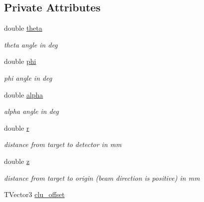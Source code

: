 \subsection*{Private Attributes}
\begin{DoxyCompactItemize}
\item 
\hypertarget{class_m_b_geometry_a1bdb9b371a2cd9839cf471e501ba3e73}{double \hyperlink{class_m_b_geometry_a1bdb9b371a2cd9839cf471e501ba3e73}{theta}}\label{class_m_b_geometry_a1bdb9b371a2cd9839cf471e501ba3e73}

\begin{DoxyCompactList}\small\item\em theta angle in deg \end{DoxyCompactList}\item 
\hypertarget{class_m_b_geometry_a464c0fbdaaaaf45ede649138121be18b}{double \hyperlink{class_m_b_geometry_a464c0fbdaaaaf45ede649138121be18b}{phi}}\label{class_m_b_geometry_a464c0fbdaaaaf45ede649138121be18b}

\begin{DoxyCompactList}\small\item\em phi angle in deg \end{DoxyCompactList}\item 
\hypertarget{class_m_b_geometry_ace0d3a561b209a84a82d5ea1c4498dbf}{double \hyperlink{class_m_b_geometry_ace0d3a561b209a84a82d5ea1c4498dbf}{alpha}}\label{class_m_b_geometry_ace0d3a561b209a84a82d5ea1c4498dbf}

\begin{DoxyCompactList}\small\item\em alpha angle in deg \end{DoxyCompactList}\item 
\hypertarget{class_m_b_geometry_af34aac40b2aed62a56371e9f90fcc093}{double \hyperlink{class_m_b_geometry_af34aac40b2aed62a56371e9f90fcc093}{r}}\label{class_m_b_geometry_af34aac40b2aed62a56371e9f90fcc093}

\begin{DoxyCompactList}\small\item\em distance from target to detector in mm \end{DoxyCompactList}\item 
\hypertarget{class_m_b_geometry_aa9b711c815dcfe6ef82f54bca77d5646}{double \hyperlink{class_m_b_geometry_aa9b711c815dcfe6ef82f54bca77d5646}{z}}\label{class_m_b_geometry_aa9b711c815dcfe6ef82f54bca77d5646}

\begin{DoxyCompactList}\small\item\em distance from target to origin (beam direction is positive) in mm \end{DoxyCompactList}\item 
\hypertarget{class_m_b_geometry_a844568e73d8f596287486f67b1dea736}{T\-Vector3 \hyperlink{class_m_b_geometry_a844568e73d8f596287486f67b1dea736}{clu\-\_\-offset}}\label{class_m_b_geometry_a844568e73d8f596287486f67b1dea736}


\end{DoxyCompactItemize}
